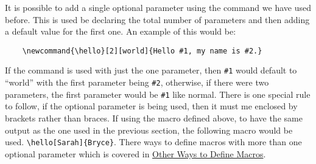 It is possible to add a single optional parameter using the command we have used before. This is used be declaring the total number of parameters and then adding a default value for the first one. An example of this would be:
\begin{verbatim}
    \newcommand{\hello}[2][world]{Hello #1, my name is #2.}
\end{verbatim}
If the command is used with just the one parameter, then \verb=#1= would default to ``world'' with the first parameter being \verb=#2=, otherwise, if there were two parameters, the first parameter would be \verb=#1= like normal. There is one special rule to follow, if the optional parameter is being used, then it must me enclosed by brackets rather than braces. If using the macro defined above, to have the same output as the one used in the previous section, the following macro would be used. \verb=\hello[Sarah]{Bryce}=. There ways to define macros with more than one optional parameter which is covered in \hyperref[section:programming/macros/otherWays]{Other Ways to Define Macros}.
